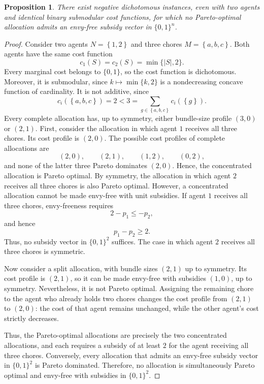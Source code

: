 \documentclass[sigconf,anonymous]{aamas}
\newcommand{\agents}{N}
\newcommand{\items}{M}
\newcommand{\cost}{c}
\newcommand{\set}[1]{\left\{#1\right\}}
\newcommand{\abs}[1]{\left\lvert#1\right\rvert}
\theoremstyle{acmplain}
\newtheorem{proposition}[theorem]{Proposition}
\theoremstyle{acmdefinition}
\theoremstyle{acmplain}
\begin{document}
\begin{proposition}
\label{prop_1}
There exist negative dichotomous instances, even with two agents and identical binary submodular cost functions, for which no Pareto-optimal allocation admits an envy-free subsidy vector in $\{0,1\}^n$.
\end{proposition}

\begin{proof}
Consider two agents $\agents=\set{1,2}$ and three chores $\items=\set{a,b,c}$. Both agents have the same cost function
\[ \cost_1(S)=\cost_2(S)=\min\{\abs S,2\}.
\]
Every marginal cost belongs to $\{0,1\}$, so the cost function is dichotomous. Moreover, it is submodular, since $k\mapsto\min\{k,2\}$ is a nondecreasing concave function of cardinality. It is not additive, since
\[\cost_i(\set{a,b,c})=2<3
    =\sum_{g\in\set{a,b,c}}\cost_i(\set g).
\]
Every complete allocation has, up to symmetry, either bundle-size profile $(3,0)$ or $(2,1)$. First, consider the allocation in which agent $1$ receives all three chores. Its cost profile is $(2,0)$. The possible cost profiles of complete allocations are
\[(2,0),\qquad (2,1),\qquad (1,2),\qquad (0,2),
\]
and none of the latter three Pareto dominates $(2,0)$. Hence, the concentrated allocation is Pareto optimal. By symmetry, the allocation in which agent $2$ receives all three chores is also Pareto optimal. However, a concentrated allocation cannot be made envy-free with unit subsidies. If agent $1$ receives all three chores, envy-freeness requires
\[
    2-p_1\leq -p_2,
\] and hence
\[
    p_1-p_2\geq 2.
\]
Thus, no subsidy vector in $\{0,1\}^2$ suffices. The case in which agent $2$ receives all three chores is symmetric.

Now consider a split allocation, with bundle sizes $(2,1)$ up to symmetry. Its cost profile is $(2,1)$, so it can be made envy-free with subsidies $(1,0)$, up to symmetry. Nevertheless, it is not Pareto optimal. Assigning the remaining chore to the agent who already holds two chores changes the cost profile from $(2,1)$ to $(2,0)$: the cost of that agent remains unchanged, while the other agent's cost strictly decreases.

Thus, the Pareto-optimal allocations are precisely the two concentrated allocations, and each requires a subsidy of at least $2$ for the agent receiving all three chores. Conversely, every allocation that admits an envy-free subsidy vector in $\{0,1\}^2$ is Pareto dominated. Therefore, no allocation is simultaneously Pareto optimal and envy-free with subsidies in $\{0,1\}^2$.
\end{proof}
\end{document}
